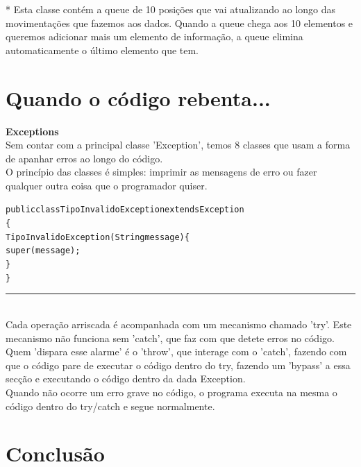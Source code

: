 \documentclass[12pt]{article}
\newenvironment{code}                    
{\textbf{
} \hspace{1cm} \hrulefill \\ 
\smallskip 
\begin{center}
\begin{minipage}{0.9\textwidth} 
\begin{alltt}\small}
{\end{alltt}
\end{minipage}
\end{center}
\hrule\smallskip
}
\begin{document}
\begin{footnotesize}
* Esta classe contém a queue de 10 posições que vai atualizando ao longo das movimentações que fazemos aos dados.
Quando a queue chega aos 10 elementos e queremos adicionar mais um elemento de informação, a queue elimina automaticamente o último elemento que tem.
\end{footnotesize}

\pagebreak

\section{Quando o código rebenta...}

\textbf{Exceptions}
\newline
~\\

Sem contar com a principal classe 'Exception', temos 8 classes que usam a forma de apanhar erros ao longo do código.
\\

O princípio das classes é simples: imprimir as mensagens de erro ou fazer qualquer outra coisa que o programador quiser.
\newline
\begin{code}
public class TipoInvalidoException extends Exception
\{
    TipoInvalidoException(String message)\{
       super(message);
    \}
\}
\end{code}
~\\

Cada operação arriscada é acompanhada com um mecanismo chamado 'try'. Este mecanismo não funciona sem 'catch', que faz com que detete erros no código. Quem 'dispara esse alarme' é o 'throw', que interage com o 'catch', fazendo com que o código pare de executar o código dentro do try, fazendo um 'bypass' a essa secção e executando o código dentro da dada Exception. 
~\\

Quando não ocorre um erro grave no código, o programa executa na mesma o código dentro do try/catch e segue normalmente.  

\pagebreak

 
\section{Conclusão}
~\\
\end{document}
